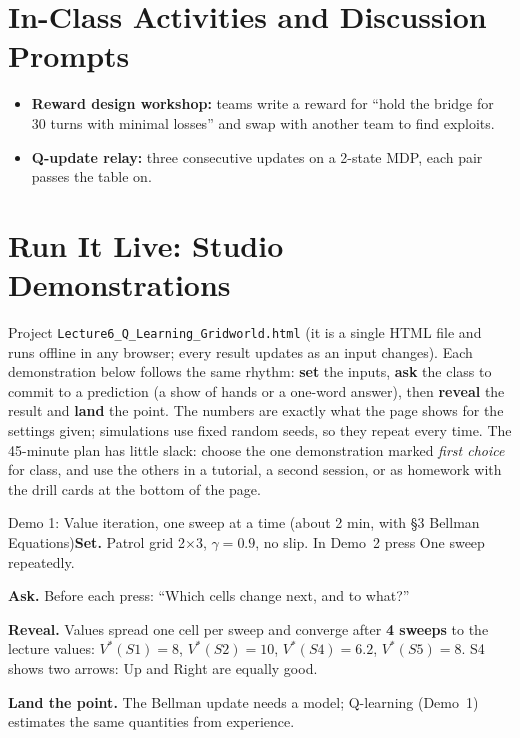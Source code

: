 \documentclass[11pt]{article}
\begin{document}
\section{In-Class Activities and Discussion Prompts}\label{sec:act}\begin{itemize}\item \textbf{Reward design workshop:} teams write a reward for ``hold the bridge for 30 turns with minimal losses'' and swap with another team to find exploits.\item \textbf{Q-update relay:} three consecutive updates on a 2-state MDP, each pair passes the table on.\end{itemize}

\section{Run It Live: Studio Demonstrations}\label{sec:live}

Project \texttt{Lecture6\_Q\_Learning\_Gridworld.html} (it is a single HTML file and runs offline in any browser; every result updates as an input changes). Each demonstration below follows the same rhythm: \textbf{set} the inputs, \textbf{ask} the class to commit to a prediction (a show of hands or a one-word answer), then \textbf{reveal} the result and \textbf{land} the point. The numbers are exactly what the page shows for the settings given; simulations use fixed random seeds, so they repeat every time. The 45-minute plan has little slack: choose the one demonstration marked \emph{first choice} for class, and use the others in a tutorial, a second session, or as homework with the drill cards at the bottom of the page.

\begin{live}{Demo 1: Value iteration, one sweep at a time (about 2 min, with \S3 Bellman Equations)}\textbf{Set.} Patrol grid 2$\times$3, $\gamma=0.9$, no slip. In Demo~2 press \textsf{One sweep} repeatedly.\par\smallskip\textbf{Ask.} Before each press: ``Which cells change next, and to what?''\par\smallskip\textbf{Reveal.} Values spread one cell per sweep and converge after \textbf{4 sweeps} to the lecture values: $V^*(S1)=8$, $V^*(S2)=10$, $V^*(S4)=6.2$, $V^*(S5)=8$. S4 shows two arrows: Up and Right are equally good.\par\smallskip\textbf{Land the point.} The Bellman update needs a model; Q-learning (Demo~1) estimates the same quantities from experience.\end{live}
\end{document}
